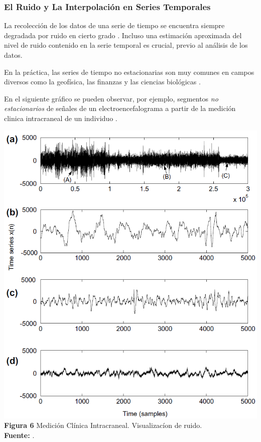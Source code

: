 \subsubsection{El Ruido y La Interpolaci\'on en Series Temporales}
La recolecci\'on de los datos de una serie de tiempo se encuentra siempre degradada por ruido en cierto grado \cite{noise}. Incluso una estimaci\'on aproximada del nivel de ruido contenido en la serie temporal es crucial, previo al an\'alisis de los datos.\par
En la pr\'actica, las series de tiempo no estacionarias son muy comunes en campos diversos como la geof\'isica, las finanzas y las ciencias biol\'ogicas \cite{concepts}.\par
En el siguiente gr\'afico se pueden observar, por ejemplo, segmentos \textit{no estacionarios} de se\~nales de un electroencefalograma a partir de la medici\'on clinica intracraneal de un individuo \cite{noise}.
\begin{center}
\includegraphics[scale=0.7]{brainsignal.png}\\
\vspace*{10pt}
\footnotesize{\textbf{Figura 6} Medici\'on Cl\'inica Intracraneal. Visualizac\'ion de ruido.}\\ \textbf{Fuente:} \cite{noise}.
\end{center}
